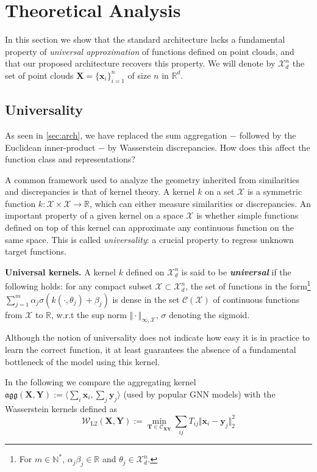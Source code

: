\documentclass[letterpaper]{article} \usepackage{aaai22}  \usepackage{times}  \usepackage{helvet}  \usepackage{courier}  \usepackage[hyphens]{url}  \usepackage{graphicx} \urlstyle{rm} \def\UrlFont{\rm}  \usepackage{natbib}  \usepackage{caption} \DeclareCaptionStyle{ruled}{labelfont=normalfont,labelsep=colon,strut=off} \frenchspacing  \setlength{\pdfpagewidth}{8.5in}  \setlength{\pdfpageheight}{11in}  \usepackage{algorithm}
\newcommand{\x}{{\mathbf x}}
\newcommand{\T}{{\mathbf T}}
\newcommand{\X}{{\mathbf X}}
\newcommand{\Y}{{\mathbf Y}}
\newcommand{\Was}{{\mathcal W}}
\begin{document}
\section{Theoretical Analysis} \label{sec:theory}

In this section we show that the standard architecture lacks a fundamental property of \textit{universal approximation} of functions defined on point clouds, and that our proposed architecture recovers this property. We will denote by $\mathcal{X}_d^n$ the set of point clouds $\X=\{\x_i\}_{i=1}^n$ of size $n$ in $\mathbb{R}^d$.

\subsection{Universality}\label{ssec:univ}

As seen in \cref{sec:arch}, we have replaced the sum aggregation $-$ followed by the Euclidean inner-product $-$ by Wasserstein discrepancies. How does this affect the function class and representations?

A common framework used to analyze the geometry inherited from similarities and discrepancies is that of kernel theory. A kernel $k$ on a set $\mathcal{X}$ is a symmetric function $k:\mathcal{X}\times\mathcal{X}\to\mathbb{R}$, which can either measure similarities or discrepancies. An important property of a given kernel on a space $\mathcal{X}$ is whether simple functions defined on top of this kernel can approximate any continuous function on the same space. This is called \textit{universality}: a crucial property to regress unknown target functions.

\noindent\textbf{Universal kernels.} A kernel $k$ defined on $\mathcal{X}_d^n$ is said to be \textbf{\textit{universal}} if the following holds: for any compact subset $\mathcal{X}\subset\mathcal{X}_d^n$, the set of functions in the form\footnote{For $m\in\mathbb{N}^*$, $\alpha_j\beta_j\in\mathbb{R}$ and $\theta_j\in\mathcal{X}_d^n$.} $\sum_{j=1}^m \alpha_j \sigma(k(\cdot,\theta_j) + \beta_j)$ is dense in the set $\mathcal{C}(\mathcal{X})$ of continuous functions from $\mathcal{X}$ to $\mathbb{R}$, w.r.t the sup norm $\Vert\cdot\Vert_{\infty,\mathcal{X}}$, $\sigma$ denoting the sigmoid.

Although the notion of universality does not indicate how easy it is in practice to learn the correct function, it at least guarantees the absence of a fundamental bottleneck of the model using this kernel.

In the following we compare the aggregating kernel $\mathfrak{agg}(\X,\Y):=\langle \sum_i \x_i  , \sum_j \mathbf{y}_j \rangle$ (used by popular GNN models) with the Wasserstein kernels defined as 
 \begin{equation}
     \Was_{\mathrm{L2}}(\X,\mathbf Y) := \min_{\T\in \mathcal{C}_{\X\mathbf Y}}\sum_{ij} T_{ij}\Vert \x_i-\mathbf y_j\Vert_2^2
\end{equation}
\end{document}
